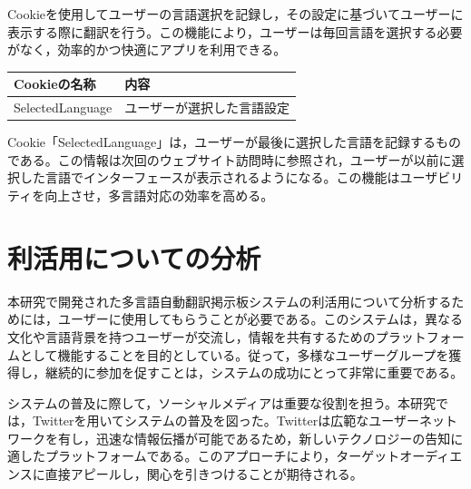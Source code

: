 \documentclass[b5paper,12pt]{jsreport}
\begin{document}
Cookieを使用してユーザーの言語選択を記録し，その設定に基づいてユーザーに表示する際に翻訳を行う。この機能により，ユーザーは毎回言語を選択する必要がなく，効率的かつ快適にアプリを利用できる。

\begin{adjustbox}{width=\textwidth,center}
    \begin{tabular}{ll}
    \toprule
    \textbf{Cookieの名称} & \textbf{内容} \\
    \midrule
    SelectedLanguage & ユーザーが選択した言語設定 \\
    \bottomrule
    \end{tabular}
\end{adjustbox}

Cookie「SelectedLanguage」は，ユーザーが最後に選択した言語を記録するものである。この情報は次回のウェブサイト訪問時に参照され，ユーザーが以前に選択した言語でインターフェースが表示されるようになる。この機能はユーザビリティを向上させ，多言語対応の効率を高める。


\chapter{利活用についての分析}

本研究で開発された多言語自動翻訳掲示板システムの利活用について分析するためには，ユーザーに使用してもらうことが必要である。このシステムは，異なる文化や言語背景を持つユーザーが交流し，情報を共有するためのプラットフォームとして機能することを目的としている。従って，多様なユーザーグループを獲得し，継続的に参加を促すことは，システムの成功にとって非常に重要である。

システムの普及に際して，ソーシャルメディアは重要な役割を担う。本研究では，Twitterを用いてシステムの普及を図った。Twitterは広範なユーザーネットワークを有し，迅速な情報伝播が可能であるため，新しいテクノロジーの告知に適したプラットフォームである。このアプローチにより，ターゲットオーディエンスに直接アピールし，関心を引きつけることが期待される。
\end{document}
